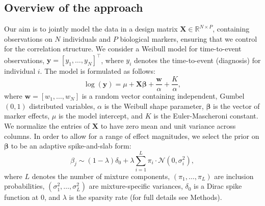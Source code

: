 \subsection{Overview of the approach}
Our aim is to jointly model the data in a design matrix $\bm{X} \in \mathbb{R}^{N \times P}$, containing observations on $N$ individuals and $P$ biological markers, ensuring that we control for the correlation structure. 
We consider a Weibull model for time-to-event observations, $\mathbf{y} = [y_1, \dots, y_N]^\top$, where $y_i$ denotes the time-to-event (diagnosis) for individual $i$. The model is formulated as follows:
\begin{equation}
    \label{eq:vampW_model_overview}
    \log (\bm{y} )=\mu + \bm{X} \bm{\beta} + \frac{\bm{w}}{\alpha} + \frac{K}{\alpha}, 
\end{equation}
where $\bm{w} = [w_1, \dots, w_N]$ is a random vector containing independent, Gumbel$(0,1)$ distributed variables, $\alpha$ is the Weibull shape parameter, $\bm{\beta}$ is the vector of marker effects, $\mu$ is the model intercept, and $K$ is the Euler-Mascheroni constant. We normalize the entries of $\bm{X}$ to have zero mean and unit variance across columns. In order to allow for a range of effect magnitudes, we select the prior on $\bm{\beta}$ to be an adaptive spike-and-slab form:
\begin{equation}
\label{eq:prior_overview}
    \beta_j \sim ( 1 - \lambda ) \delta_0 + \lambda \sum^L_{i=1} \pi_i \cdot \mathcal{N}(0, \sigma^2_i),
\end{equation}
where $L$ denotes the number of mixture components, $(\pi_1, \dots, \pi_L)$ are inclusion probabilities, $(\sigma^2_1, \dots, \sigma^2_L)$ are mixture-specific variances, $\delta_0$ is a Dirac spike function at 0, and $\lambda$ is the sparsity rate (for full details see Methods).

